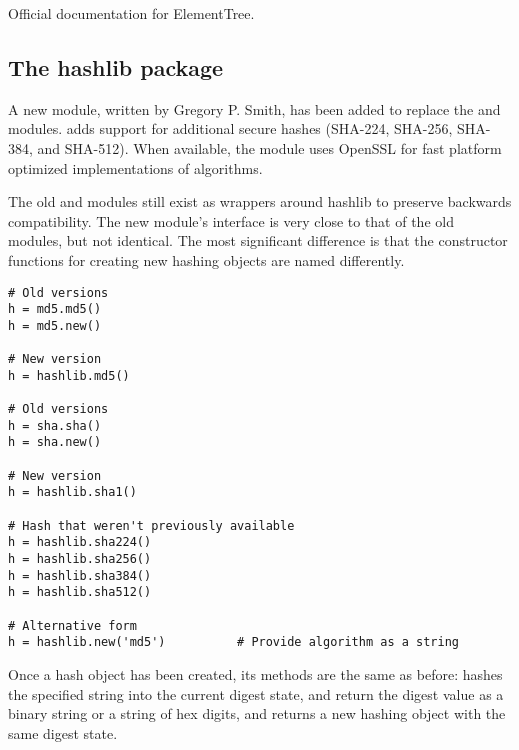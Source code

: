 \documentclass{howto}
\begin{document}
\begin{seealso}

{Official documentation for ElementTree.}


\end{seealso}


\subsection{The hashlib package\label{module-hashlib}}

A new  module, written by Gregory P. Smith, 
has been added to replace the
 and  modules.   adds support
for additional secure hashes (SHA-224, SHA-256, SHA-384, and SHA-512).
When available, the module uses OpenSSL for fast platform optimized
implementations of algorithms.  

The old  and  modules still exist as wrappers
around hashlib to preserve backwards compatibility.  The new module's
interface is very close to that of the old modules, but not identical.
The most significant difference is that the constructor functions
for creating new hashing objects are named differently.

\begin{verbatim}
# Old versions
h = md5.md5()   
h = md5.new()   

# New version 
h = hashlib.md5()

# Old versions
h = sha.sha()   
h = sha.new()   

# New version 
h = hashlib.sha1()

# Hash that weren't previously available
h = hashlib.sha224()
h = hashlib.sha256()
h = hashlib.sha384()
h = hashlib.sha512()

# Alternative form
h = hashlib.new('md5')          # Provide algorithm as a string
\end{verbatim}

Once a hash object has been created, its methods are the same as before:
 hashes the specified string into the 
current digest state,  and 
return the digest value as a binary string or a string of hex digits,
and  returns a new hashing object with the same digest state.


\end{document}
